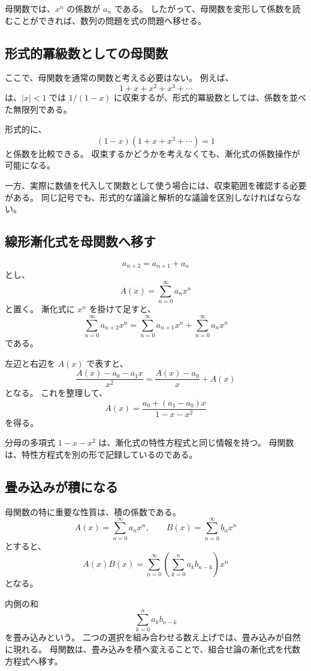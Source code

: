 母関数では、$x^n$ の係数が $a_n$ である。
したがって、母関数を変形して係数を読むことができれば、数列の問題を式の問題へ移せる。

\subsection{形式的冪級数としての母関数}

ここで、母関数を通常の関数と考える必要はない。
例えば、
\[
  1+x+x^2+x^3+\cdots
\]
は、$|x|<1$ では $1/(1-x)$ に収束するが、形式的冪級数としては、係数を並べた無限列である。

形式的に、
\[
  (1-x)(1+x+x^2+\cdots)=1
\]
と係数を比較できる。
収束するかどうかを考えなくても、漸化式の係数操作が可能になる。

一方、実際に数値を代入して関数として使う場合には、収束範囲を確認する必要がある。
同じ記号でも、形式的な議論と解析的な議論を区別しなければならない。

\subsection{線形漸化式を母関数へ移す}

\[
  a_{n+2}=a_{n+1}+a_n
\]
とし、
\[
  A(x)=\sum_{n=0}^{\infty}a_nx^n
\]
と置く。
漸化式に $x^n$ を掛けて足すと、
\[
  \sum_{n=0}^{\infty}a_{n+2}x^n
  =
  \sum_{n=0}^{\infty}a_{n+1}x^n
  +
  \sum_{n=0}^{\infty}a_nx^n
\]
である。

左辺と右辺を $A(x)$ で表すと、
\[
  \frac{A(x)-a_0-a_1x}{x^2}
  =
  \frac{A(x)-a_0}{x}+A(x)
\]
となる。
これを整理して、
\[
  A(x)=\frac{a_0+(a_1-a_0)x}{1-x-x^2}
\]
を得る。

分母の多項式 $1-x-x^2$ は、漸化式の特性方程式と同じ情報を持つ。
母関数は、特性方程式を別の形で記録しているのである。

\subsection{畳み込みが積になる}

母関数の特に重要な性質は、積の係数である。
\[
  A(x)=\sum_{n=0}^{\infty}a_nx^n,\qquad
  B(x)=\sum_{n=0}^{\infty}b_nx^n
\]
とすると、
\[
  A(x)B(x)
  =
  \sum_{n=0}^{\infty}
  \left(\sum_{k=0}^{n}a_kb_{n-k}\right)x^n
\]
となる。

内側の和
\[
  \sum_{k=0}^{n}a_kb_{n-k}
\]
を畳み込みという。
二つの選択を組み合わせる数え上げでは、畳み込みが自然に現れる。
母関数は、畳み込みを積へ変えることで、組合せ論の漸化式を代数方程式へ移す。

